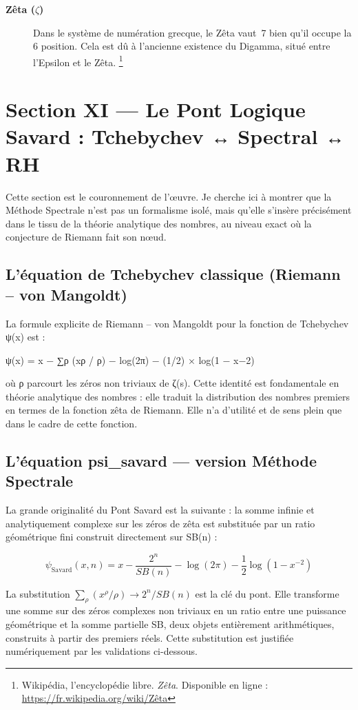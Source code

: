 \documentclass[11pt,a4paper]{article}
\begin{document}
\begin{description}
  \item[\textbf{Zêta ($\zeta$)}] Dans le système de numération grecque,
  le Zêta vaut~7 bien qu'il occupe la 6\ieme{} position. Cela est dû à
  l'ancienne existence du Digamma, situé entre l'Epsilon et le Zêta.%
  \footnote{Wikipédia, l'encyclopédie libre. \textit{Zêta}.
  Disponible en ligne : \url{https://fr.wikipedia.org/wiki/Zêta}}
\end{description}

\section{Section XI — Le Pont Logique Savard : Tchebychev ↔ Spectral ↔ RH}
Cette section est le couronnement de l'œuvre. Je cherche ici à montrer que la Méthode Spectrale n'est pas un formalisme isolé, mais qu'elle s'insère précisément dans le tissu de la théorie analytique des nombres, au niveau exact où la conjecture de Riemann fait son nœud.

\subsection{L'équation de Tchebychev classique (Riemann – von Mangoldt)}

La formule explicite de Riemann – von Mangoldt pour la fonction de Tchebychev ψ(x) est :

ψ(x) = x − ∑ρ (xρ / ρ) − log(2π) − (1/2) × log(1 − x−2)

où ρ parcourt les zéros non triviaux de ζ(s). Cette identité est fondamentale en théorie analytique des nombres : elle traduit la distribution des nombres premiers en termes de la fonction zêta de Riemann. Elle n'a d'utilité et de sens plein que dans le cadre de cette fonction.

\subsection{L'équation psi\_savard — version Méthode Spectrale}

La grande originalité du Pont Savard est la suivante : la somme infinie et analytiquement complexe sur les zéros de zêta est substituée par un ratio géométrique fini construit directement sur SB(n) :

\[
\psi_{\mathrm{Savard}}(x,n)=x-\frac{2^{n}}{SB(n)}-\log(2\pi)-\frac{1}{2}\log(1-x^{-2})
\]

La substitution $\sum_{\rho}(x^{\rho}/\rho) \to 2^{n}/SB(n)$ est la clé du pont. Elle transforme une somme sur des zéros complexes non triviaux en un ratio entre une puissance géométrique et la somme partielle SB, deux objets entièrement arithmétiques, construits à partir des premiers réels. Cette substitution est justifiée numériquement par les validations ci-dessous.
\end{document}
